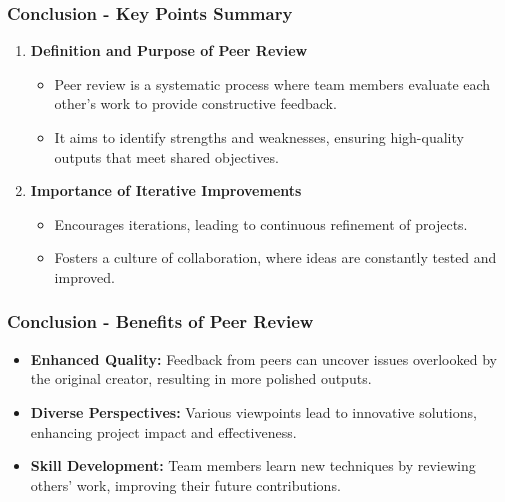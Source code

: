 \documentclass{beamer}
\begin{document}
\begin{frame}[fragile]
    \frametitle{Conclusion - Key Points Summary}
    \begin{enumerate}
        \item \textbf{Definition and Purpose of Peer Review}
        \begin{itemize}
            \item Peer review is a systematic process where team members evaluate each other's work to provide constructive feedback.
            \item It aims to identify strengths and weaknesses, ensuring high-quality outputs that meet shared objectives.
        \end{itemize}

        \item \textbf{Importance of Iterative Improvements}
        \begin{itemize}
            \item Encourages iterations, leading to continuous refinement of projects.
            \item Fosters a culture of collaboration, where ideas are constantly tested and improved.
        \end{itemize}
    \end{enumerate}
\end{frame}

\begin{frame}[fragile]
    \frametitle{Conclusion - Benefits of Peer Review}
    \begin{itemize}
        \item \textbf{Enhanced Quality:} 
        Feedback from peers can uncover issues overlooked by the original creator, resulting in more polished outputs.
        
        \item \textbf{Diverse Perspectives:} 
        Various viewpoints lead to innovative solutions, enhancing project impact and effectiveness.
        
        \item \textbf{Skill Development:} 
        Team members learn new techniques by reviewing others’ work, improving their future contributions.
    \end{itemize}
\end{frame}
\end{document}
